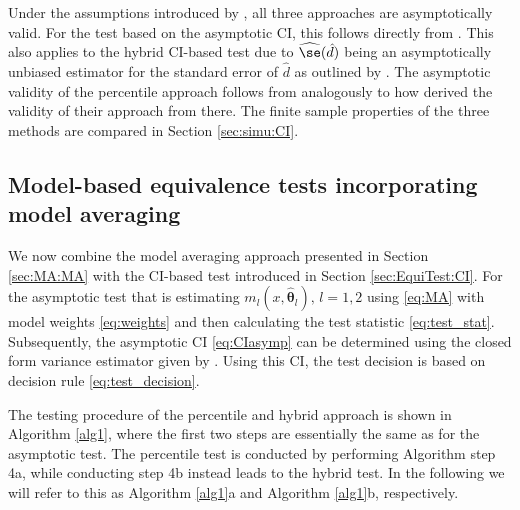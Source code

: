 {Under the assumptions introduced by \citet{Dette2018}, all three approaches are asymptotically valid. For the test based on the asymptotic CI, this follows directly from \citet{Dette2018}. This also applies to the hybrid CI-based test due to $\widehat{\se}(\hat{d})$ being an asymptotically unbiased estimator for the standard error of $\hat{d}$ as outlined by \citet{Efron1994}.
The asymptotic validity of the 
percentile approach follows from \citet[][Appendix: proof of Theorem 4]{Dette2018} analogously to how \citet[][Appendix A.3]{Bastian2024} derived the validity of their approach from there.
The finite sample properties of the three methods are compared in Section \ref{sec:simu:CI}.


\subsection{Model-based equivalence tests incorporating model averaging} \label{sec:EquiTest:MA}
We now combine the model averaging approach presented in Section \ref{sec:MA:MA} with the CI-based test introduced in Section \ref{sec:EquiTest:CI}. For the asymptotic test that is estimating $m_l(x, \hat{\boldsymbol{\theta}}_{l}), \, l=1,2$ using \eqref{eq:MA}
with model weights \eqref{eq:weights} and then calculating the test statistic \eqref{eq:test_stat}. 
Subsequently, the asymptotic CI \eqref{eq:CIasymp} can be determined using the closed form variance estimator given by \citet{Dette2018}. Using this CI, the test decision is based on decision rule \eqref{eq:test_decision}.

The testing procedure of the percentile and hybrid approach is shown in Algorithm \ref{alg1}, where the first two steps are essentially the same as for the asymptotic test. The percentile test is conducted by performing Algorithm step 4a, while conducting step 4b instead leads to the hybrid test. In the following we will refer to this as Algorithm \ref{alg1}a and Algorithm \ref{alg1}b, respectively.

\begin{breakablealgorithm} \caption{} \label{alg1} 


\end{breakablealgorithm}}
